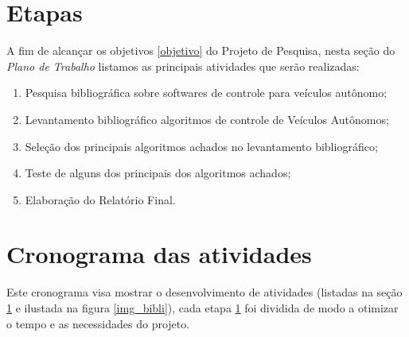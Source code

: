 \documentclass{article}
\begin{document}
\section{Etapas} \label{etapas}
A fim de alcançar os objetivos \ref{objetivo} do Projeto de Pesquisa, nesta seção do \textit{Plano de Trabalho} listamos as principais atividades que serão realizadas:


\begin{enumerate}
    \item  Pesquisa bibliográfica sobre softwares de controle para veículos autônomo;
    \item Levantamento bibliográfico algoritmos de controle de Veículos Autônomos;
    \item  Seleção dos principais algoritmos achados no levantamento bibliográfico;
    \item Teste de alguns dos principais dos algoritmos achados;
    \item Elaboração do Relatório Final.
\end{enumerate}

\section{Cronograma das atividades}
Este cronograma visa mostrar o desenvolvimento de atividades (listadas na seção \ref{etapas} e ilustada na figura \ref{img_bibli}), cada etapa \ref{etapas} foi dividida de modo a otimizar o tempo e as necessidades do projeto.
\end{document}
